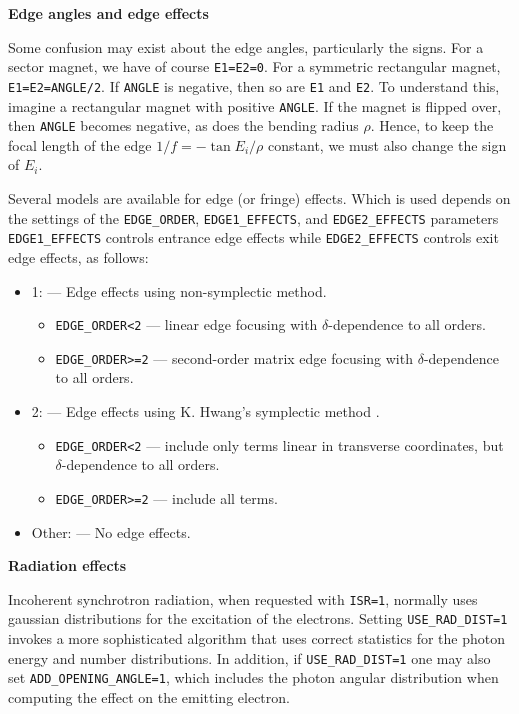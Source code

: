{\bf Edge angles and edge effects} 

Some confusion may exist about the edge angles, particularly the signs.
For a sector magnet, we have of course \verb|E1=E2=0|.  For a symmetric rectangular
magnet, \verb|E1=E2=ANGLE/2|.  If \verb|ANGLE| is negative, then so are
\verb|E1| and \verb|E2|.  To understand this, imagine a rectangular magnet with positive \verb|ANGLE|.
If the magnet is flipped over, then \verb|ANGLE| becomes negative, as does the bending
radius $\rho$.    Hence, to keep the focal length
of the edge $1/f = -\tan E_i /\rho$ constant, we must also change the sign of
$E_i$.

Several models are available for edge (or fringe) effects. Which is used depends on the
settings of the \verb|EDGE_ORDER|, \verb|EDGE1_EFFECTS|, and \verb|EDGE2_EFFECTS| parameters
\verb|EDGE1_EFFECTS| controls entrance edge effects while \verb|EDGE2_EFFECTS| controls exit edge effects,
as follows:
\begin{itemize}
  \item 1: --- Edge effects using non-symplectic method.
    \begin{itemize}
      \item \verb|EDGE_ORDER<2| --- linear edge focusing with $\delta$-dependence to all orders.
      \item \verb|EDGE_ORDER>=2| --- second-order matrix edge focusing with $\delta$-dependence to all orders.
    \end{itemize}              
  \item 2: --- Edge effects using K. Hwang's symplectic method \cite{KHwang}.
    \begin{itemize}
      \item \verb|EDGE_ORDER<2| --- include only terms linear in transverse coordinates, but $\delta$-dependence to all orders.
      \item \verb|EDGE_ORDER>=2| --- include all terms.
    \end{itemize}              
  \item Other: --- No edge effects.
\end{itemize}

{\bf Radiation effects}

Incoherent synchrotron radiation, when requested with {\tt ISR=1},
normally uses gaussian distributions for the excitation of the electrons.
Setting {\tt USE\_RAD\_DIST=1} invokes a more sophisticated algorithm that
uses correct statistics for the photon energy and number distributions.
In addition, if {\tt USE\_RAD\_DIST=1} one may also set {\tt ADD\_OPENING\_ANGLE=1},
which includes the photon angular distribution when computing the effect on 
the emitting electron.  

